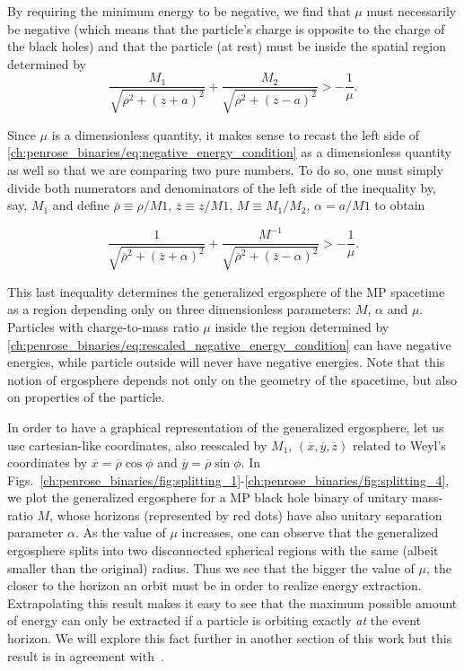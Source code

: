 By requiring the minimum energy to be negative, we find that $\mu$ must necessarily be negative (which means that the particle's charge is opposite to the charge of the black holes) and that the particle (at rest) must be inside the spatial region determined by
\begin{equation} \label{ch:penrose_binaries/eq:negative_energy_condition}
  \frac{M_1}{\sqrt{\rho^2 + (z+a)^2}} + \frac{M_2}{\sqrt{\rho^2 + (z-a)^2}} > - \frac{1}{\mu}.
\end{equation}

Since $\mu$ is a dimensionless quantity, it makes sense to recast the left side of \eqref{ch:penrose_binaries/eq:negative_energy_condition} as a dimensionless quantity as well so that we are comparing two pure numbers. To do so, one must simply divide both numerators and denominators of the left side of the inequality by, say, $M_1$ and define $\overline{\rho} \equiv \rho/M1$, $\overline{z} \equiv z/M1$, $M \equiv M_1/M_2$, $\alpha = a/M1$ to obtain

\begin{equation} \label{ch:penrose_binaries/eq:rescaled_negative_energy_condition}
  \frac{1}{\sqrt{\overline{\rho}^2 + (\overline{z}+\alpha)^2}} + \frac{M^{-1}}{\sqrt{\overline{\rho}^2 + (\overline{z}-\alpha)^2}} > - \frac{1}{\mu}.
\end{equation}

This last inequality determines the generalized ergosphere of the MP spacetime as a region depending only on three dimensionless parameters: $M$, $\alpha$ and $\mu$. Particles with charge-to-mass ratio $\mu$ inside the region determined by \eqref{ch:penrose_binaries/eq:rescaled_negative_energy_condition} can have negative energies, while particle outside will never have negative energies. Note that this notion of ergosphere depends not only on the geometry of the spacetime, but also on properties of the particle.

In order to have a graphical representation of the generalized ergosphere, let us use cartesian-like coordinates, also reescaled by $M_1$, $(\overline{x},\overline{y},\overline{z})$ related to Weyl's coordinates by $\overline{x}=\overline{\rho} \cos \phi$ and $\overline{y}=\overline{\rho} \sin \phi$. In Figs.~\ref{ch:penrose_binaries/fig:splitting_1}-\ref{ch:penrose_binaries/fig:splitting_4}, we plot the generalized ergosphere for a MP black hole binary of unitary mass-ratio $M$, whose horizons (represented by red dots) have also unitary separation parameter $\alpha$. As the value of $\mu$ increases, one can observe that the generalized ergosphere splits into two disconnected spherical regions with the same (albeit smaller than the original) radius. Thus we see that the bigger the value of $\mu$, the closer to the horizon an orbit must be in order to realize energy extraction. Extrapolating this result makes it easy to see that the maximum possible amount of energy can only be extracted if a particle is orbiting exactly \emph{at} the event horizon. We will explore this fact further in another section of this work but this result is in agreement with~\cite{RUFFINI1971}.

